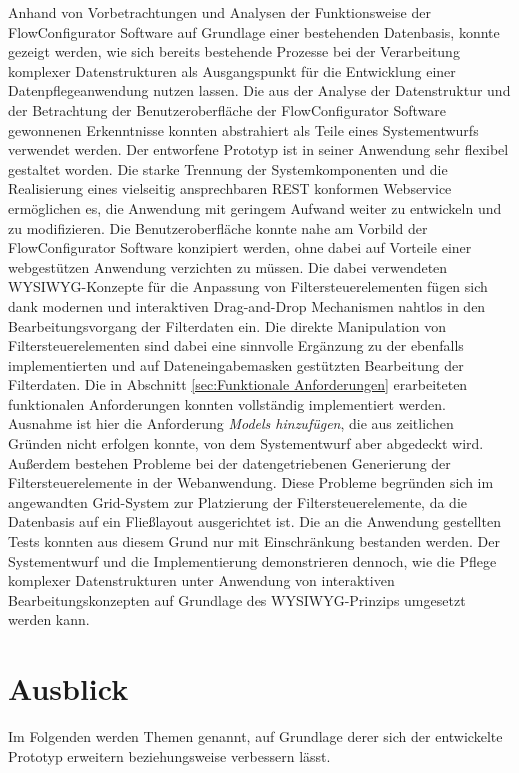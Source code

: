 Anhand von Vorbetrachtungen und Analysen der Funktionsweise der FlowConfigurator Software auf Grundlage einer bestehenden Datenbasis, konnte gezeigt werden, wie sich bereits bestehende Prozesse bei der Verarbeitung komplexer Datenstrukturen als Ausgangspunkt für die Entwicklung einer Datenpflegeanwendung nutzen lassen. Die aus der Analyse der Datenstruktur und der Betrachtung der Benutzeroberfläche der FlowConfigurator Software gewonnenen Erkenntnisse konnten abstrahiert als Teile eines Systementwurfs verwendet werden. Der entworfene Prototyp ist in seiner Anwendung sehr flexibel gestaltet worden. Die starke Trennung der Systemkomponenten und die Realisierung eines vielseitig ansprechbaren REST konformen Webservice ermöglichen es, die Anwendung mit geringem Aufwand weiter zu entwickeln und zu modifizieren. Die Benutzeroberfläche konnte nahe am Vorbild der FlowConfigurator Software konzipiert werden, ohne dabei auf Vorteile einer webgestützen Anwendung verzichten zu müssen. Die dabei verwendeten WYSIWYG-Konzepte für die Anpassung von Filtersteuerelementen fügen sich dank modernen und interaktiven Drag-and-Drop Mechanismen nahtlos in den Bearbeitungsvorgang der Filterdaten ein. Die direkte Manipulation von Filtersteuerelementen sind dabei eine sinnvolle Ergänzung zu der ebenfalls implementierten und auf Dateneingabemasken gestützten Bearbeitung der Filterdaten. Die in Abschnitt \ref{sec:Funktionale Anforderungen} erarbeiteten funktionalen Anforderungen konnten vollständig implementiert werden. Ausnahme ist hier die Anforderung \emph{Models hinzufügen}, die aus zeitlichen Gründen nicht erfolgen konnte, von dem Systementwurf aber abgedeckt wird. Außerdem bestehen Probleme bei der datengetriebenen Generierung der Filtersteuerelemente in der Webanwendung. Diese Probleme begründen sich im angewandten Grid-System zur Platzierung der Filtersteuerelemente, da die Datenbasis auf ein Fließlayout ausgerichtet ist. Die an die Anwendung gestellten Tests konnten aus diesem Grund nur mit Einschränkung bestanden werden. Der Systementwurf und die Implementierung demonstrieren dennoch, wie die Pflege komplexer Datenstrukturen unter Anwendung von interaktiven Bearbeitungskonzepten auf Grundlage des WYSIWYG-Prinzips umgesetzt werden kann.

\section{Ausblick}

Im Folgenden werden Themen genannt, auf Grundlage derer sich der entwickelte Prototyp erweitern beziehungsweise verbessern lässt.

